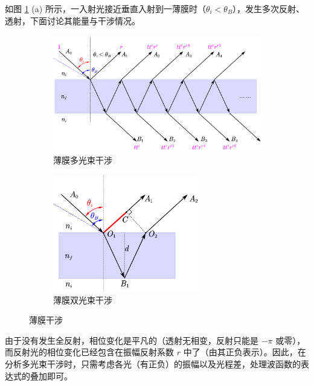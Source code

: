 \documentclass[UTF8]{report}
\theoremstyle{MyLineTheoremStyle} %
\theoremstyle{MyBlockTheoremStyle} %
\theoremstyle{MySubsubsectionStyle} %
\begin{document}
如图 \ref{薄膜干涉} (a) 所示，一入射光接近垂直入射到一薄膜时（$\theta_i < \theta_B$），发生多次反射、透射，下面讨论其能量与干涉情况。

\begin{figure}[H]\centering
    \begin{subfigure}[t]{0.6\columnwidth}\centering
        \includegraphics[height=145pt]{assets/3/薄膜干涉.pdf}
        \caption{ 薄膜多光束干涉 }
    \end{subfigure}\hfill
    \begin{subfigure}[t]{0.4\columnwidth}\centering
        \includegraphics[height=145pt]{assets/3/薄膜双光束干涉.pdf}
        \caption{ 薄膜双光束干涉 }
    \end{subfigure}
    \caption{ 薄膜干涉 }\label{薄膜干涉}
\end{figure}

由于没有发生全反射，相位变化是平凡的（透射无相变，反射只能是 $-\pi$ 或零），而反射光的相位变化已经包含在振幅反射系数 $r$ 中了（由其正负表示）。因此，在分析多光束干涉时，只需考虑各光（有正负）的振幅以及光程差，处理波函数的表达式的叠加即可。
\end{document}
